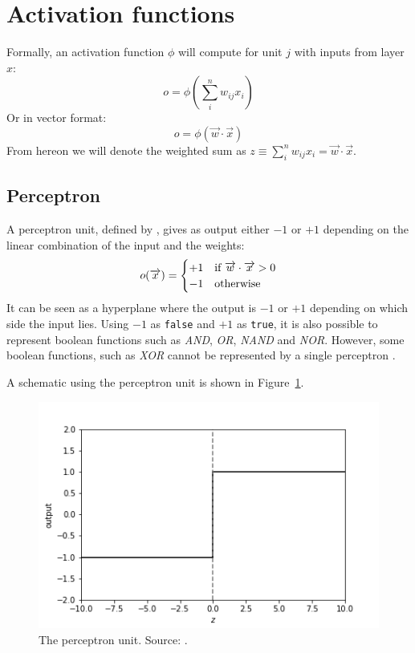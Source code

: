 \section{Activation functions} %
\label{sec:activation_functions}
Formally, an activation function $\phi$ will compute for unit $j$ with inputs from layer $x$:
\begin{equation}
    o = \phi\left(\sum_i^n w_{ij} x_i\right)
\end{equation}
Or in vector format:
\begin{equation}
    o = \phi(\overrightarrow{w} \cdot \overrightarrow{x})
\end{equation}
From hereon we will denote the weighted sum as $z \equiv \sum_i^n w_{ij} x_i = \overrightarrow{w} \cdot \overrightarrow{x}$.\\

\subsection{Perceptron} %
\label{sub:perceptron}
A perceptron unit, defined by \cite{Rosenblatt58}, gives as output either $-1$ or $+1$ depending on the linear combination of the input and the weights:
\begin{equation}
o(\overrightarrow{x}) = \begin{cases}
+1 & \text{if $ \overrightarrow{w} \cdot \overrightarrow{x} > 0$}\\
-1 & \text{otherwise}
\end{cases}
\end{equation}
It can be seen as a hyperplane where the output is $-1$ or $+1$ depending on which side the input lies.
Using $-1$ as \texttt{false} and $+1$ as \texttt{true}, it is also possible to represent boolean functions such as \textit{AND}, \textit{OR}, \textit{NAND} and \textit{NOR}. However, some boolean functions, such as \textit{XOR} cannot be represented by a single perceptron \parencite{ML}.

A schematic using the perceptron unit is shown in Figure~\ref{fig:perceptron}.\\
\begin{figure}[htb]
    \centering
    \includegraphics[width=.8\linewidth]{images/activation_functions/perceptron.png}
    \caption[The perceptron unit]{The perceptron unit. Source: \cite{Demant2013}.}
    \label{fig:perceptron}
\end{figure}

